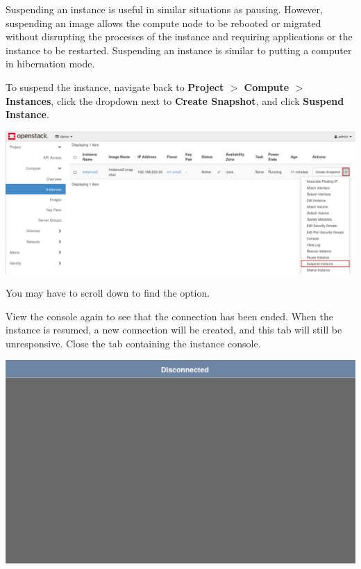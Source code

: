 \documentclass[letterpaper, 12pt]{article}
\begin{document}
\begin{enumerate}
    \begin{tipbox}
        Suspending an instance is useful in similar situations as pausing.
        However, suspending an image allows the compute node to be rebooted or migrated without disrupting the processes of the instance and requiring applications or the instance to be restarted.
        Suspending an instance is similar to putting a computer in hibernation mode.
    \end{tipbox}

    \begin{labstep}
        To suspend the instance, navigate back to \textbf{Project $>$ Compute $>$ Instances}, click the dropdown next to \textbf{Create Snapshot}, and click \textbf{Suspend Instance}.

        \begin{center}
            \includegraphics[width=\linewidth]{images/part3/step8.png}
        \end{center}
    \end{labstep}

    \begin{notebox}
        You may have to scroll down to find the option.
    \end{notebox}

    \begin{labstep}
        View the console again to see that the connection has been ended.
        When the instance is resumed, a new connection will be created, and this tab will still be unresponsive.
        Close the tab containing the instance console.

        \begin{center}
            \includegraphics[width=\linewidth]{images/part3/step9.png}
        \end{center}
    \end{labstep}


\end{enumerate}
\end{document}
